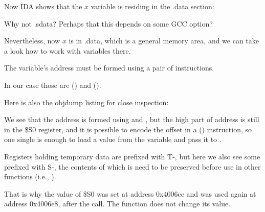 Now IDA shows that the $x$ variable is residing in the .data section:



Why not .sdata? Perhaps that this depends on some GCC option?

Nevertheless, now $x$ is in .data, which is a general memory area, and we can take a look
how to work with variables there.


The variable's address must be formed using a pair of instructions.

In our case those are  () and  ().

Here is also the objdump listing for close inspection:




We see that the address is formed using  and , but the high part of address is still in
the \$S0 register, and it is possible to encode the offset in a  () instruction, so one single  is enough 
to load a value from the variable and pass it to \printf.

Registers holding temporary data are prefixed with T-, but here we also see some prefixed with S-, 
the contents of which is need to be preserved before use in other functions (i.e., ).

That is why the value of \$S0 was set at address 0x4006cc and was used again
at address 0x4006e8, after the \scanf call. 
The \scanf function does not change its value.

